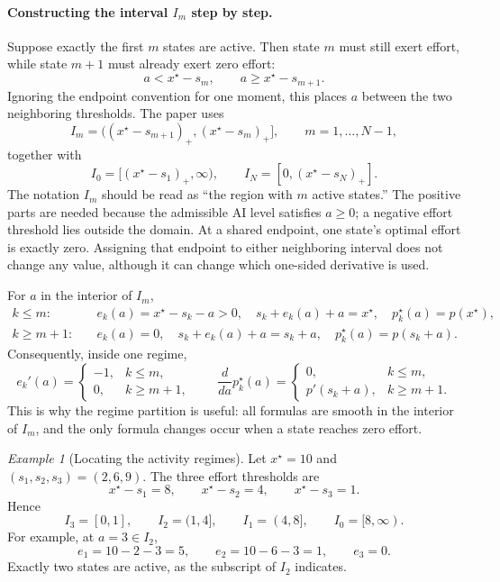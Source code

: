 \documentclass[11pt]{article}
\theoremstyle{tutorial}
\theoremstyle{remark}
\newtheorem{example}[theorem]{Example}
\newcommand{\1}{\mathbb{I}}
\newcommand{\pos}[1]{\left(#1\right)_{+}}
\begin{document}
\paragraph{Constructing the interval $I_m$ step by step.}
Suppose exactly the first $m$ states are active.  Then state $m$ must still exert effort, while state
$m+1$ must already exert zero effort:
\[
  a<x^\star-s_m,
  \qquad
  a\ge x^\star-s_{m+1}.
\]
Ignoring the endpoint convention for one moment, this places $a$ between the two neighboring thresholds.
The paper uses
\[
  I_m=\bigl(\pos{x^\star-s_{m+1}},\pos{x^\star-s_m}\bigr],
  \qquad m=1,\ldots,N-1,
\]
together with
\[
  I_0=[\pos{x^\star-s_1},\infty),
  \qquad
  I_N=[0,\pos{x^\star-s_N}].
\]
The notation $I_m$ should be read as ``the region with $m$ active states.''  The positive parts are needed
because the admissible AI level satisfies $a\ge0$; a negative effort threshold lies outside the domain.
At a shared endpoint, one state's optimal effort is exactly zero.  Assigning that endpoint to either
neighboring interval does not change any value, although it can change which one-sided derivative is used.

For $a$ in the interior of $I_m$,
\[
\begin{aligned}
k\le m:\quad
&e_k(a)=x^\star-s_k-a>0,\quad
s_k+e_k(a)+a=x^\star,\quad
p_k^\star(a)=p(x^\star),\\
k\ge m+1:\quad
&e_k(a)=0,\quad
s_k+e_k(a)+a=s_k+a,\quad
p_k^\star(a)=p(s_k+a).
\end{aligned}
\]
Consequently, inside one regime,
\[
e_k'(a)=
\begin{cases}-1,&k\le m,\\0,&k\ge m+1,\end{cases}
\qquad
\frac{d}{da}p_k^\star(a)=
\begin{cases}0,&k\le m,\\p'(s_k+a),&k\ge m+1.\end{cases}
\]
This is why the regime partition is useful: all formulas are smooth in the interior of $I_m$, and the only
formula changes occur when a state reaches zero effort.

\begin{example}[Locating the activity regimes]
Let $x^\star=10$ and $(s_1,s_2,s_3)=(2,6,9)$.  The three effort thresholds are
\[
  x^\star-s_1=8,
  \qquad x^\star-s_2=4,
  \qquad x^\star-s_3=1.
\]
Hence
\[
I_3=[0,1],\qquad I_2=(1,4],\qquad I_1=(4,8],\qquad I_0=[8,\infty).
\]
For example, at $a=3\in I_2$,
\[
e_1=10-2-3=5,\qquad e_2=10-6-3=1,\qquad e_3=0.
\]
Exactly two states are active, as the subscript of $I_2$ indicates.
\end{example}
\end{document}
